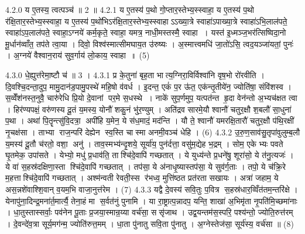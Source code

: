 4.2.0
य ए॒तस्य॒ त्वत्पञ्च॑ ॥ 2 ॥
4.2.1
य ए॒तस्य॑ प॒थो गो॒प्तार॒स्तेभ्य॒स्स्वाहा॒ य ए॒तस्य॑ प॒थो र॑क्षि॒तार॒स्तेभ्य॒स्स्वाहा॒ य ए॒तस्य॑ प॒थो॑भिऽर॑क्षि॒तार॒स्तेभ्य॒स्स्वाहाऽऽख्या॒त्रे स्वाहा॑ऽपाख्या॒त्रे स्वाहा॑ऽभि॒लाल॑पते॒ स्वाहा॑ऽप॒लाल॑पते॒ स्वाहा॒ऽग्नये॑ कर्म॒कृते॒ स्वाहा॒ यमत्र॒ नाधी॒मस्तस्मै॒ स्वाहा । यस्त॑ इ॒ध्मञ्ज॒भर॑त्सिष्विदा॒नो मू॒र्धान॑व्वाँत॒ तप॑ते त्वा॒या । दिवो॒ विश्व॑स्मात्सीमघाय॒त उ॑रुष्यः । अ॒स्मात्त्वमधि॑ जा॒तो॑ऽसि॒ त्वद॒यञ्जा॑यतां॒ पुनः॑ । अ॒ग्नये॑ वैश्वान॒राय॑ सुव॒र्गाय॑ लो॒काय॒ स्वाहा ॥ (5)
\anuvakamend

4.3.0
धे॒ह्युत्त॑रेमा॒ष्टौ च॑ ॥ 3 ।
4.3.1
प्र के॒तुना॑ बृह॒ता भात्य॒ग्निरा॒विर्विश्वा॑नि वृष॒भो रो॑रवीति । दि॒वश्चि॒दन्ता॒दुप॒ मामु॒दान॑ड॒पामु॒पस्थे॑ महि॒षो व॑वर्ध । इ॒दन्त॒ एकं॑ प॒र ऊ॑त॒ एक॑न्तृ॒तीये॑न॒ ज्योति॑षा॒ संवि॑शस्व । स॒व्वेँश॑नस्त॒नुवै॒ चारु॑रेधि प्रि॒यो दे॒वानां पर॒मे स॒धस्थे । नाके॑ सुप॒र्णमुप॒ यत्पत॑न्त हृ॒दा वेन॑न्तो अ॒भ्यच॑क्षत त्वा । हिर॑ण्यपक्षं॒ वरु॑णस्य दू॒तं य॒मस्य॒ योनौ॑ शकु॒नं भु॑र॒ण्युम् । अति॑द्रव सारमे॒यौ श्वानौ॑ चतुर॒क्षौ श॒बलौ॑ सा॒धुना॑ प॒था । अथा॑ पि॒तॄन्त्सु॑वि॒दत्रा॒ अपी॑हि य॒मेन॒ ये स॑ध॒मादं॒ मद॑न्ति । यौ ते॒ श्वानौ॑ यमरक्षि॒तारौ॑ चतुर॒क्षौ प॑थि॒रक्षी॑ नृ॒चक्ष॑सा । ताभ्या राज॒न्परि॑ देह्येन स्व॒स्ति चास्मा अनमी॒वञ्च॑ धेहि । (6)
4.3.2
उ॒रु॒ण॒साव॑सु॒तृपा॑वुलुम्ब॒लौ य॒मस्य॑ दू॒तौ च॑रतो॒ वशा॒ अनु॑ । ताव॒स्मभ्य॑न्दृ॒शये॒ सूर्या॑य॒ पुन॑र्दत्ता॒ वसु॑म॒द्येह भ॒द्रम् । सोम॒ एकेभ्यः पवते घृ॒तमेक॒ उपा॑सते । येभ्यो॒ मधु॑ प्र॒धाव॑ति॒ ताश्चि॑दे॒वापि॑ गच्छतात् । ये युध्य॑न्ते प्र॒धने॑षु॒ शूरा॑सो॒ ये त॑नु॒त्यजः॑ । ये वा॑ स॒हस्र॑दक्षिणा॒स्ता श्चि॑दे॒वापि॑ गच्छतात् । तप॑सा॒ ये अ॑नाधृ॒ष्यास्तप॑सा॒ ये सुव॑र्ग॒ताः । तपो॒ ये च॑क्रि॒रे म॒हत्ताश्चि॑दे॒वापि॑ गच्छतात् । अश्म॑न्वती रेवती॒स्स र॑भध्व॒ मुत्ति॑ष्ठत प्रत॑रता सखायः । अत्रा॑ जहाम॒ ये अस॒न्नशे॑वाश्शि॒वान् व॒यम॒भि वाजा॒नुत्त॑रेम । (7)
4.3.3
यद्वै दे॒वस्य॑ सवि॒तुः प॒वित्र स॒हस्र॑धार॒व्विँत॑तम॒न्तरि॑क्षे । येनापु॑ना॒दिन्द्र॒मना॑र्त॒मार्त्यै॒ तेना॒हं मा स॒र्वत॑नुं पुनामि । या रा॒ष्ट्रात्प॒न्नादप॒ यन्ति॒ शाखा॑ अ॒भिमृ॑ता नृ॒पति॑मि॒च्छमा॑नाः । धा॒तुस्तास्सर्वाः॒ पव॑नेन पू॒ताः प्र॒जया॒स्मान्र॒य्या वर्च॑सा॒ ससृ॑जाथ । उद्व॒यन्तम॑स॒स्परि॒ पश्य॑न्तो॒ ज्योति॒रुत्त॑रम् । दे॒वन्दे॑व॒त्रा सूर्य॒मग॑न्म॒ ज्योति॑रुत्त॒मम् । धा॒ता पु॑नातु सवि॒ता पु॑नातु । अ॒ग्नेस्तेज॑सा॒ सूर्य॑स्य॒ वर्च॑सा ॥ (8)
\anuvakamend

